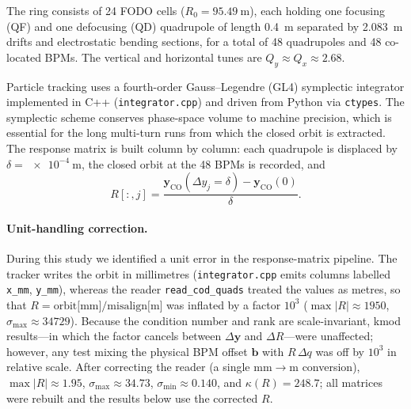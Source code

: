 \documentclass[preprint,12pt]{elsarticle}
\begin{document}
The ring consists of 24 FODO cells ($R_0=\SI{95.49}{\meter}$), each
holding one focusing (QF) and one defocusing (QD) quadrupole of length
\SI{0.4}{\meter} separated by \SI{2.083}{\meter} drifts and electrostatic
bending sections, for a total of 48 quadrupoles and 48 co-located BPMs.
The vertical and horizontal tunes are $Q_{y}\approx Q_{x}\approx2.68$.

Particle tracking uses a fourth-order Gauss--Legendre (GL4) symplectic
integrator implemented in C++ (\texttt{integrator.cpp}) and driven from
Python via \texttt{ctypes}. The symplectic scheme conserves phase-space
volume to machine precision, which is essential for the long multi-turn
runs from which the closed orbit is extracted. The response matrix is
built column by column: each quadrupole is displaced by
$\delta=\SI{e-4}{\meter}$, the closed orbit at the 48 BPMs is recorded,
and
\begin{equation}
R[:,j] = \frac{\mathbf{y}_\mathrm{CO}(\Delta y_j=\delta)
              -\mathbf{y}_\mathrm{CO}(0)}{\delta}.
\end{equation}

\paragraph{Unit-handling correction.}
During this study we identified a unit error in the response-matrix
pipeline. The tracker writes the orbit in millimetres
(\texttt{integrator.cpp} emits columns labelled \texttt{x\_mm},
\texttt{y\_mm}), whereas the reader \texttt{read\_cod\_quads} treated the
values as metres, so that $R=\text{orbit[mm]}/\text{misalign[m]}$ was
inflated by a factor $10^3$ ($\max|R|\approx1950$,
$\sigma_{\max}\approx34729$). Because the condition number and rank are
scale-invariant, kmod results---in which the factor cancels between
$\Delta\mathbf{y}$ and $\Delta R$---were unaffected; however, any test
mixing the physical BPM offset $\mathbf{b}$ with $R\,\Delta q$ was off by
$10^3$ in relative scale. After correcting the reader (a single
mm$\rightarrow$m conversion), $\max|R|\approx1.95$,
$\sigma_{\max}\approx34.73$, $\sigma_{\min}\approx0.140$, and
$\kappa(R)=248.7$; all matrices were rebuilt and the results below use the
corrected $R$.
\end{document}
